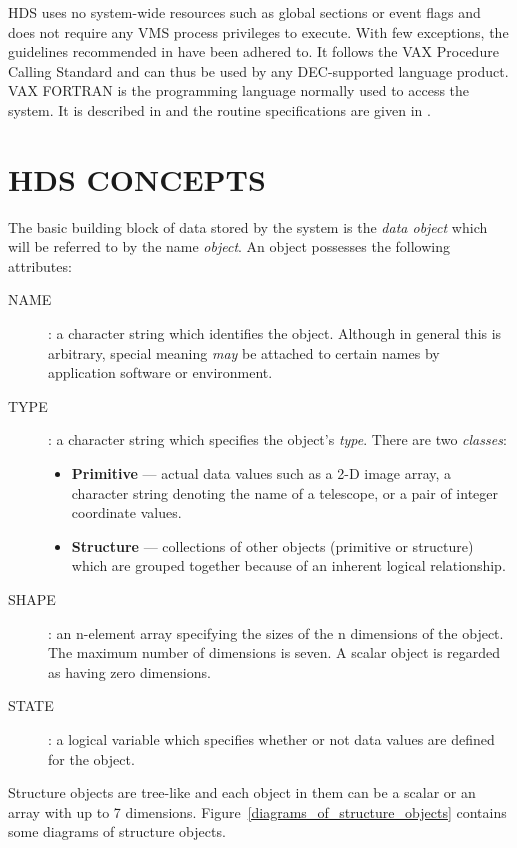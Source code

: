 HDS uses no system-wide resources such as global sections or event flags and
does not require any VMS process privileges to execute. With few exceptions,
the guidelines recommended in \cite{creating_modular_procedures} have been
adhered to. It follows the VAX Procedure Calling Standard and can thus be used
by any DEC-supported language product. VAX FORTRAN is the programming language
normally used to access the system. It is described in
\cite{programming_in_fortran} and the routine specifications are given in
\cite{sun_92}. 

\section {HDS CONCEPTS}

The basic building block of data stored by the system is the {\em data object}
which will be referred to by the name {\em object}. An object possesses the
following attributes: 

\begin {description}
\item [NAME]: a character string which identifies the object. Although in
general this is arbitrary, special meaning {\em may} be attached to certain
names by application software or environment. 
\item [TYPE]: a character string which specifies the object's {\em type}.
There are two {\em classes}: 
\begin {itemize} 
\item {\bf Primitive} --- actual data values such as a 2-D image array, a
character string denoting the name of a telescope, or a pair of integer
coordinate values. 
\item {\bf Structure} --- collections of other objects (primitive or structure)
which are grouped together because of an inherent logical relationship. 
\end {itemize}
\item [SHAPE]: an n-element array specifying the sizes of the n dimensions of
the object. The maximum number of dimensions is seven. A scalar object is
regarded as having zero dimensions. 
\item [STATE]: a logical variable which specifies whether or not data values
are defined for the object. 
\end {description}

Structure objects are tree-like and each object in them can be a scalar or an
array with up to 7 dimensions. Figure~\ref{diagrams_of_structure_objects}
contains some diagrams of structure objects. 

